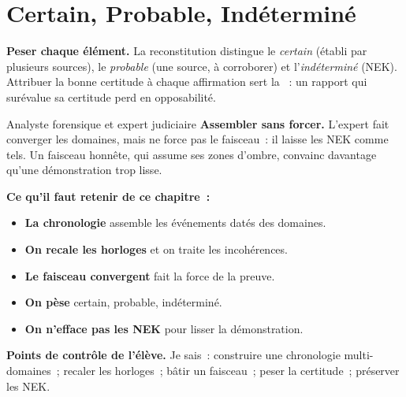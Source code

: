 \section{Certain, Probable, Indéterminé}
\label{sec:c17-certitude}

\begin{boxCRO}
\textbf{Peser chaque élément.} La reconstitution distingue le \emph{certain}
(établi par plusieurs sources), le \emph{probable} (une source, à corroborer)
et l'\emph{indéterminé} (NEK). Attribuer la bonne certitude à chaque
affirmation sert la ~: un rapport qui surévalue sa certitude
perd en opposabilité.
\end{boxCRO}

\begin{boxmetier}{Analyste forensique et expert judiciaire}
\textbf{Assembler sans forcer.} L'expert fait converger les domaines, mais ne
force pas le faisceau~: il laisse les NEK comme tels. Un faisceau honnête, qui
assume ses zones d'ombre, convainc davantage qu'une démonstration trop lisse.
\end{boxmetier}

\separateur

\begin{boxresume}
\textbf{Ce qu'il faut retenir de ce chapitre~:}
\begin{itemize}
    \item \textbf{La chronologie} assemble les événements datés des domaines.
    \item \textbf{On recale les horloges} et on traite les incohérences.
    \item \textbf{Le faisceau convergent} fait la force de la preuve.
    \item \textbf{On pèse} certain, probable, indéterminé.
    \item \textbf{On n'efface pas les NEK} pour lisser la démonstration.
\end{itemize}
\end{boxresume}

\begin{boxinfo}
\textbf{Points de contrôle de l'élève.} Je sais~: construire une chronologie
multi-domaines~; recaler les horloges~; bâtir un faisceau~; peser la
certitude~; préserver les NEK.
\end{boxinfo}

\bigskip

